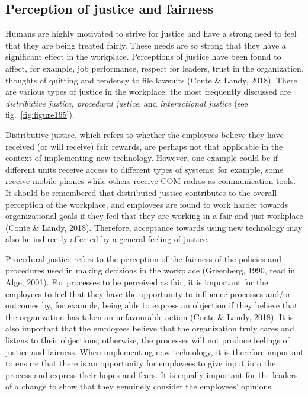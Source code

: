 \documentclass[
  12pt,
]{scrbook}
\begin{document}
\hypertarget{perception-of-justice-and-fairness}{%
\subsection*{Perception of justice and fairness}\label{perception-of-justice-and-fairness}}

Humans are highly motivated to strive for justice and have a strong need to feel that they are being treated fairly. These needs are so strong that they have a significant effect in the workplace. Perceptions of justice have been found to affect, for example, job performance, respect for leaders, trust in the organization, thoughts of quitting and tendency to file lawsuits (Conte \& Landy, 2018). There are various types of justice in the workplace; the most frequently discussed are \emph{distributive justice, procedural justice}, and \emph{interactional justice} (see fig.~\ref{fig:figure165}).

Distributive justice, which refers to whether the employees believe they have received (or will receive) fair rewards, are perhaps not that applicable in the context of implementing new technology. However, one example could be if different units receive access to different types of systems; for example, some receive mobile phones while others receive COM radios as communication tools. It should be remembered that distributed justice contributes to the overall perception of the workplace, and employees are found to work harder towards organizational goals if they feel that they are working in a fair and just workplace (Conte \& Landy, 2018). Therefore, acceptance towards using new technology may also be indirectly affected by a general feeling of justice.~

Procedural justice refers to the perception of the fairness of the policies and procedures used in making decisions in the workplace (Greenberg, 1990, read in Alge, 2001). For processes to be perceived as fair, it is important for the employees to feel that they have the opportunity to influence processes and/or outcomes by, for example, being able to express an objection if they believe that the organization has taken an unfavourable action (Conte \& Landy, 2018). It is also important that the employees believe that the organization truly cares and listens to their objections; otherwise, the processes will not produce feelings of justice and fairness. When implementing new technology, it is therefore important to ensure that there is an opportunity for employees to give input into the process and express their hopes and fears. It is equally important for the leaders of a change to show that they genuinely consider the employees' opinions.
\end{document}
